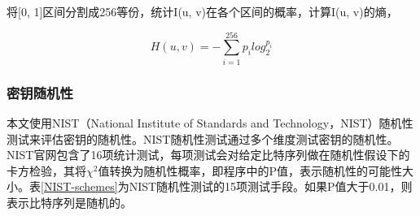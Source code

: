 \documentclass[master]{seuthesis} %
\begin{document}
\begin{Main}
将[0, 1]区间分割成256等份，统计I(u, v)在各个区间的概率，计算I(u, v)的熵，

\begin{equation}
  H(u, v) = -\sum_{i=1}^{256} p_i log_2^{p_i}
\end{equation}

\subsubsection{密钥随机性}

本文使用NIST（National Institute of Standards and Technology，NIST）随机性测试来评估密钥的随机性\cite{bassham2010statistical}。NIST随机性测试通过多个维度测试密钥的随机性\cite{zaman2012review}。NIST官网包含了16项统计测试，每项测试会对给定比特序列做在随机性假设下的卡方检验，其将$\chi^2$值转换为随机性概率，即程序中的P值，表示随机性的可能性大小。表\ref{NIST-schemes}为NIST随机性测试的15项测试手段。如果P值大于0.01，则表示比特序列是随机的。



\end{Main}
\end{document}
